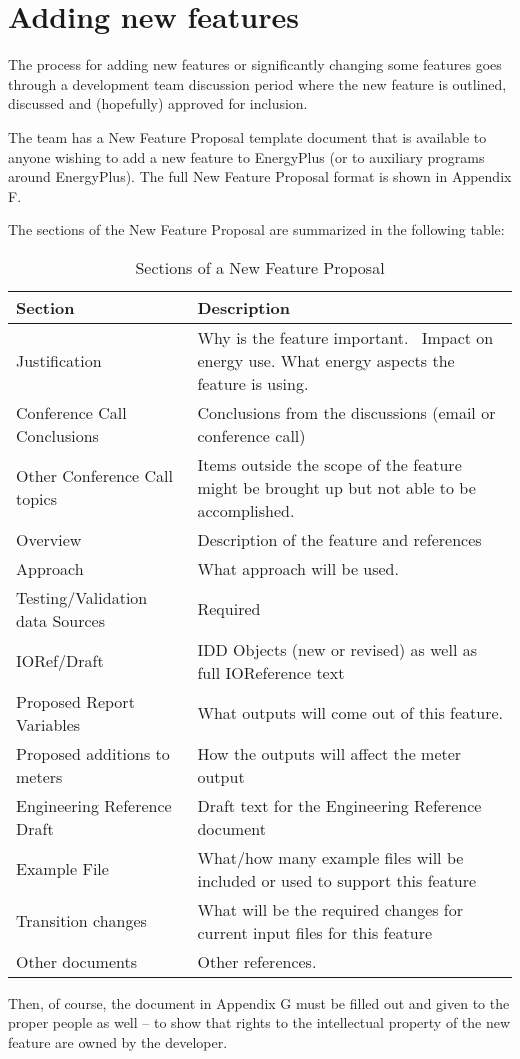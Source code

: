 \section{Adding new features}\label{adding-new-features}

The process for adding new features or significantly changing some features goes through a development team discussion period where the new feature is outlined, discussed and (hopefully) approved for inclusion.

The team has a New Feature Proposal template document that is available to anyone wishing to add a new feature to EnergyPlus (or to auxiliary programs around EnergyPlus). The full New Feature Proposal format is shown in Appendix F.

The sections of the New Feature Proposal are summarized in the following table:

\begin{longtable}[c]{p{1.5in}p{4.5in}}
\caption{Sections of a New Feature Proposal \protect \label{table:sections-of-a-new-feature-proposal}}\\
\toprule 
Section & Description \tabularnewline \midrule
\endhead
Justification & Why is the feature important.~ Impact on energy use. What energy aspects the feature is using. \tabularnewline
Conference Call Conclusions & Conclusions from the discussions (email or conference call) \tabularnewline
Other Conference Call topics & Items outside the scope of the feature might be brought up but not able to be accomplished. \tabularnewline
Overview & Description of the feature and references \tabularnewline
Approach & What approach will be used. \tabularnewline
Testing/Validation data Sources & Required \tabularnewline
IORef/Draft & IDD Objects (new or revised) as well as full IOReference text \tabularnewline
Proposed Report Variables & What outputs will come out of this feature. \tabularnewline
Proposed additions to meters & How the outputs will affect the meter output \tabularnewline
Engineering Reference Draft & Draft text for the Engineering Reference document \tabularnewline
Example File & What/how many example files will be included or used to support this feature \tabularnewline
Transition changes & What will be the required changes for current input files for this feature \tabularnewline
Other documents & Other references. \tabularnewline
\bottomrule
\end{longtable}

Then, of course, the document in Appendix G must be filled out and given to the proper people as well -- to show that rights to the intellectual property of the new feature are owned by the developer.

